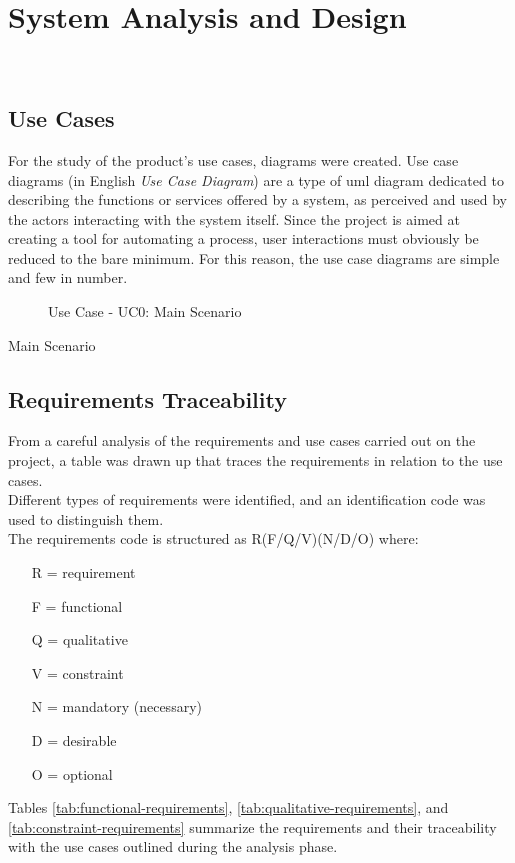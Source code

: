 \chapter{System Analysis and Design}
\label{chap:system-analysis-and-design}

\\

\section{Use Cases}

For the study of the product's use cases, diagrams were created.
Use case diagrams (in English \emph{Use Case Diagram}) are a type of \gls{uml} diagram dedicated to describing the functions or services offered by a system, as perceived and used by the actors interacting with the system itself.
Since the project is aimed at creating a tool for automating a process, user interactions must obviously be reduced to the bare minimum. For this reason, the use case diagrams are simple and few in number.

\begin{figure}[!h] 
    \centering 

    \caption{Use Case - UC0: Main Scenario}
\end{figure}

\begin{usecase}{0}{Main Scenario}
\label{uc:main-scenario}
\end{usecase}

\section{Requirements Traceability}

From a careful analysis of the requirements and use cases carried out on the project, a table was drawn up that traces the requirements in relation to the use cases.\\
Different types of requirements were identified, and an identification code was used to distinguish them.\\
The requirements code is structured as R(F/Q/V)(N/D/O) where:
\begin{enumerate}
    \item[R =] requirement
    \item[F =] functional
    \item[Q =] qualitative
    \item[V =] constraint
    \item[N =] mandatory (necessary)
    \item[D =] desirable
    \item[O =] optional
\end{enumerate}
Tables \ref{tab:functional-requirements}, \ref{tab:qualitative-requirements}, and \ref{tab:constraint-requirements} summarize the requirements and their traceability with the use cases outlined during the analysis phase.


